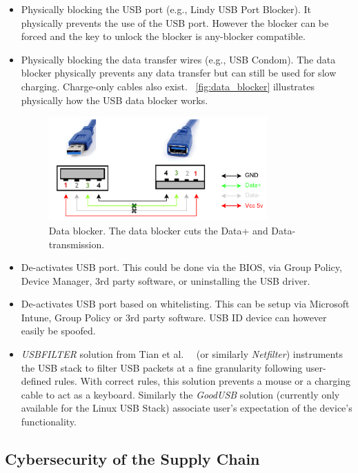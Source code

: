 \begin{itemize}
    \item Physically blocking the USB port (e.g., Lindy USB Port Blocker). It physically prevents the use of the USB port. However the blocker can be forced and the key to unlock the blocker is any-blocker compatible.
    \item Physically blocking the data transfer wires (e.g., USB Condom). The data blocker physically prevents any data transfer but can still be used for slow charging. Charge-only cables also exist. ~\autoref{fig:data_blocker} illustrates physically how the USB data blocker works.
    \begin{figure}[H]
        \centering
        \includegraphics[height=4cm]{figures/data-blocker.png}
        \caption{Data blocker. The data blocker cuts the Data+ and Data- transmission.}
        \label{fig:data_blocker}
    \end{figure}
    \item De-activates USB port. This could be done via the BIOS, via Group Policy, Device Manager, 3rd party software, or uninstalling the USB driver.
    \item De-activates USB port based on whitelisting. This can be setup via Microsoft Intune, Group Policy or 3rd party software. USB ID device can however easily be spoofed. 
    \item \emph{USBFILTER} solution from Tian et al.~\cite{Tian15}~\cite{tian16} (or similarly \emph{Netfilter}) instruments the USB stack to filter USB packets at a fine granularity following user-defined rules. With correct rules, this solution prevents a mouse or a charging cable to act as a keyboard. Similarly the \emph{GoodUSB} solution  (currently only available for the Linux USB Stack) associate user's expectation of the device's functionality.
\end{itemize}


\subsection{Cybersecurity of the Supply Chain}

